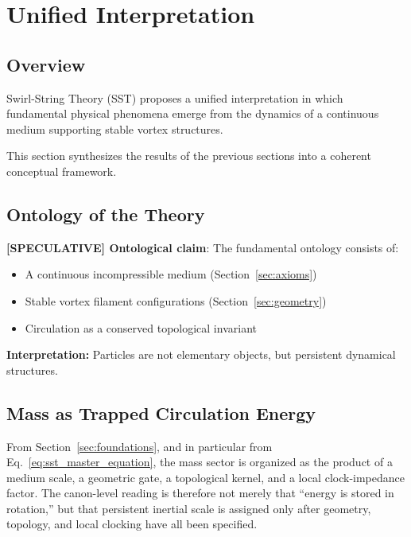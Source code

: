 \documentclass[11pt]{article}
\theoremstyle{definition}
\theoremstyle{plain}
\theoremstyle{remark}
\begin{document}
\section{Unified Interpretation}
    \label{sec:unification}
    
    \subsection{Overview}
        
        Swirl-String Theory (SST) proposes a unified interpretation in which fundamental physical phenomena emerge from the dynamics of a continuous medium supporting stable vortex structures.
        
        This section synthesizes the results of the previous sections into a coherent conceptual framework.
    
    \subsection{Ontology of the Theory}
        
        \textbf{[SPECULATIVE] Ontological claim}:
        The fundamental ontology consists of:
        
        \begin{itemize}
            \item A continuous incompressible medium (Section~\ref{sec:axioms})
            \item Stable vortex filament configurations (Section~\ref{sec:geometry})
            \item Circulation as a conserved topological invariant
        \end{itemize}
        
        \textbf{Interpretation:}
        Particles are not elementary objects, but persistent dynamical structures.
    
    \subsection{Mass as Trapped Circulation Energy}
        
        From Section~\ref{sec:foundations}, and in particular from Eq.~\eqref{eq:sst_master_equation}, the mass sector is organized as the product of a medium scale, a geometric gate, a topological kernel, and a local clock-impedance factor. The canon-level reading is therefore not merely that ``energy is stored in rotation,'' but that persistent inertial scale is assigned only after geometry, topology, and local clocking have all been specified.
        
\end{document}
